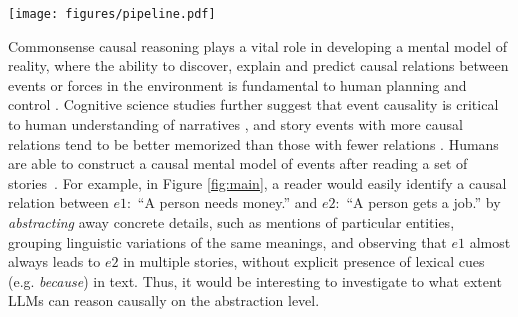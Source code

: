 \begin{figure*}[htb]
    \centering
    \texttt{[image: figures/pipeline.pdf]}
    \caption{Pipeline of abstract causal event discovery. An event is viewed from three hierarchical levels: \textbf{mention} (realization in a specific text corpus), \textbf{generalization} (conceptualization of the event's components) 
    and \textbf{abstraction} (group of causally consistent generalizations). Given a collection of event mentions, Phase $1$ produces a collection of abstractions $A, B,C$ that are mapped back to the original corpus to construct a suitable representation in Phase $2$, such as a co-occurrence matrix. Causal discovery algorithms can then be employed to detect causal relations within the data, which may consider the contexts.}
    \label{fig:main}
\end{figure*}


Commonsense causal reasoning plays a vital role in developing a mental model of reality, where the ability to discover, explain and predict causal relations between events or forces in the environment is fundamental to human planning and control \citep{johnson2017mental, griffiths2017formalizing}. Cognitive science studies further suggest that event causality is critical to human understanding of narratives \citep{van1996children,fletcher1988causal,tillman2020children,sun2023event}, and story events with more causal relations tend to be better memorized than those with fewer relations \citep{graesser200310}. Humans are able to construct a causal mental model of events after reading a set of stories~\citep{zwaan1995construction}. For example, in Figure \ref{fig:main}, a reader would easily identify a causal relation between $e1:$ ``A person needs money.'' and $e2:$ ``A person gets a job.'' by \textit{abstracting} away concrete details, such as mentions of particular entities, grouping linguistic variations of the same meanings, and observing that $e1$ almost always leads to $e2$ in multiple stories, without explicit presence of lexical cues (e.g. \textit{because}) in text. Thus, it would be interesting to investigate to what extent LLMs can reason causally on the abstraction level.


